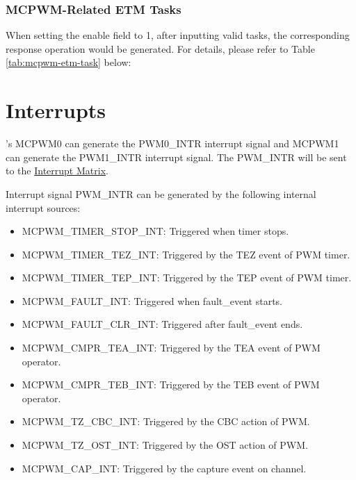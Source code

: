 \documentclass[main\_\_EN.tex]{subfiles}
\begin{document}


\subsubsection{MCPWM-Related ETM Tasks}
When setting the enable field to 1, after inputting valid tasks, the corresponding response operation would be generated. For details, please refer to Table \ref{tab:mcpwm-etm-task} below:






\section{Interrupts}
\label{sec:mcpwm-interrupts}

\chipname{}'s MCPWM0 can generate the PWM0\_INTR interrupt signal and MCPWM1 can generate the PWM1\_INTR interrupt signal. The PWM\_INTR will be sent to the \hyperref[mod:intmtrx]{Interrupt Matrix}.

Interrupt signal PWM\_INTR can be generated by the following internal interrupt sources:
\begin{itemize}
\item \label{int:mcpwm-timer-stop}MCPWM\_TIMER\_STOP\_INT: Triggered when timer stops.
\item \label{int:mcpwm-timer-TEZ}MCPWM\_TIMER\_TEZ\_INT: Triggered by the TEZ event of PWM timer.
\item \label{int:mcpwm-timer-tep}MCPWM\_TIMER\_TEP\_INT: Triggered by the TEP event of PWM timer.
\item \label{int:mcpwm-fault}MCPWM\_FAULT\_INT: Triggered when fault\_event starts.
\item \label{int:mcpwm-fault-clr}MCPWM\_FAULT\_CLR\_INT: Triggered after fault\_event ends.
\item \label{int:mcpwm-cmpr-tea}MCPWM\_CMPR\_TEA\_INT: Triggered by the TEA event of PWM operator.
\item \label{int:mcpwm-cmpr-teb}MCPWM\_CMPR\_TEB\_INT: Triggered by the TEB event of PWM operator.
\item \label{int:mcpwm-tz-cbc}MCPWM\_TZ\_CBC\_INT: Triggered by the CBC action of PWM.
\item \label{int:mcpwm-tz-ost}MCPWM\_TZ\_OST\_INT: Triggered by the OST action of PWM.
\item \label{int:mcpwm-cap}MCPWM\_CAP\_INT: Triggered by the capture event on channel.
\end{itemize}
\end{document}
